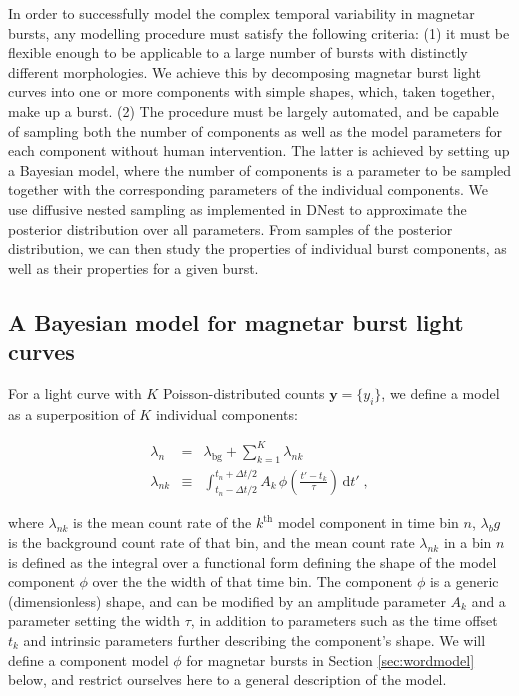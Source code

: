 \documentclass[12pt]{emulateapj}
\newcommand{\given}{\,|\,}
\newcommand{\dd}{\mathrm{d}}
\newcommand{\counts}{y}
\newcommand{\pars}{\theta}
\newcommand{\mean}{\lambda}
\newcommand{\Poisson}{{\mathcal P}}
\newcommand{\bg}{\mathrm{bg}}
\newcommand{\word}{\phi}
\begin{document}
In order to successfully model the complex temporal variability in magnetar bursts, any modelling procedure must satisfy the following criteria: (1) it must be flexible enough to be applicable to a large number of bursts with distinctly different morphologies. We achieve this by decomposing magnetar burst light curves into one or more components with simple shapes, which, taken together, make up a burst. (2) The procedure must be largely automated, and be capable of sampling both the number of components as well as the model parameters for each component without human intervention. The latter is achieved by setting up a Bayesian model, where the number of components is a parameter to be sampled together with the corresponding parameters of the individual components. We use diffusive nested sampling as implemented in DNest \citep{brewer2011} to approximate the posterior distribution over all parameters. From samples of the posterior distribution,
we can then study the properties of individual burst components, as well as their properties for a given burst.

\subsection{A Bayesian model for magnetar burst light curves}
\label{sec:model}

For a light curve with $K$ Poisson-distributed counts $\bm{\counts} = \{\counts_i\}$, we define a model as a superposition of $K$ individual components:

\begin{eqnarray}
\mean_n &=& \mean_{\bg} + \sum_{k=1}^K \mean_{nk}
\\
\mean_{nk} &\equiv& \int_{t_n-\Delta t/2}^{t_n+\Delta t/2} A_k\,\word(\frac{t'-t_k}{\tau})\,\dd t' \; ,
\end{eqnarray}

where $\mean_{nk}$ is the mean count rate of the $k^{\mathrm{th}}$ model component in time bin $n$, 
$\mean_bg$ is the background count rate of that bin,
and the mean count rate $\mean_{nk}$ in a bin $n$ is defined as the integral over a functional form defining the shape of
the model component $\word$ over the the width of that time bin. The component $\word$ is a generic (dimensionless) shape,
and can be modified by an amplitude parameter $A_k$ and a parameter setting the width $\tau$, in addition to
parameters such as the time offset $t_k$ and intrinsic parameters further describing the component's shape.
We will define a component model $\word$ for magnetar bursts in Section \ref{sec:wordmodel} below, and
restrict ourselves here to a general description of the model.
 
\end{document}
